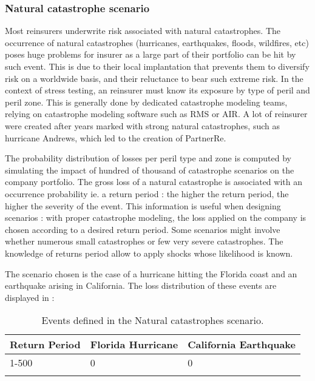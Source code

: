 \subsubsection{Natural catastrophe scenario}

Most reinsurers underwrite risk associated with natural catastrophes. The occurrence of natural catastrophes (hurricanes, earthquakes, floods, wildfires, etc) poses huge problems for insurer as a large part of their portfolio can be hit by such event. This is due to their local implantation that prevents them to diversify risk on a worldwide basis, and their reluctance to bear such extreme risk.
In the context of stress testing, an reinsurer must know its exposure by type of peril and peril zone. This is generally done by dedicated catastrophe modeling teams, relying on catastrophe modeling software such as RMS or AIR. A lot of reinsurer were created after years marked with strong natural catastrophes, such as hurricane Andrews, which led to the creation of PartnerRe.

The probability distribution of losses per peril type and zone is computed by simulating the impact of hundred of thousand of catastrophe scenarios on the company portfolio. The gross loss of a natural catastrophe is associated with an occurrence probability ie. a return period : the higher the return period, the higher the severity of the event. This information is useful when designing scenarios : with proper catastrophe modeling, the loss applied on the company is chosen according to a desired return period. Some scenarios might involve whether numerous small catastrophes or few very severe catastrophes. The knowledge of returns period allow to apply shocks whose likelihood is known.



The scenario chosen is the case of a hurricane hitting the Florida coast and an earthquake arising in California. The loss distribution of these events are displayed in :


\begin{table}
\centering
\begin{tabular}{|l|l|l|}
\hline
   \textbf{Return Period} & \textbf{Florida Hurricane} & \textbf{California Earthquake} \\ \hline \hline
   1-500 & 0 & 0 \\ \hline
   \label{t:CAT_NAT_EVENT}
\end{tabular}
   \caption{Events defined in the Natural catastrophes scenario.}
\end{table}

